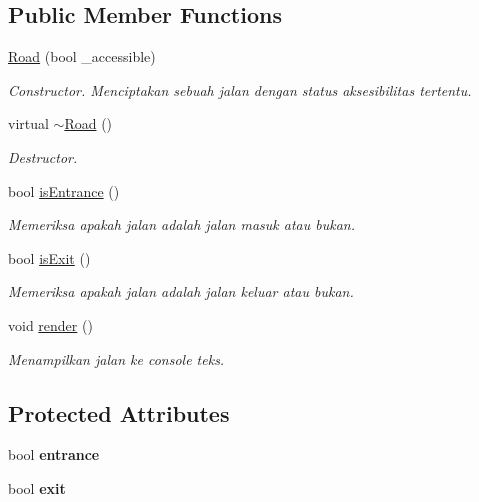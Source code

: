 \subsection*{Public Member Functions}
\begin{DoxyCompactItemize}
\item 
\hyperlink{classRoad_ae98fca3cfb8223b281b4d7787646cf38}{Road} (bool \+\_\+accessible)
\begin{DoxyCompactList}\small\item\em Constructor. Menciptakan sebuah jalan dengan status aksesibilitas tertentu. \end{DoxyCompactList}\item 
\hypertarget{classRoad_a3fa0feda8a96c3763d5f5a1f06f2972e}{virtual \hyperlink{classRoad_a3fa0feda8a96c3763d5f5a1f06f2972e}{$\sim$\+Road} ()}\label{classRoad_a3fa0feda8a96c3763d5f5a1f06f2972e}

\begin{DoxyCompactList}\small\item\em Destructor. \end{DoxyCompactList}\item 
bool \hyperlink{classRoad_a6ada8e407c575e9d03d07f51ad318df6}{is\+Entrance} ()
\begin{DoxyCompactList}\small\item\em Memeriksa apakah jalan adalah jalan masuk atau bukan. \end{DoxyCompactList}\item 
bool \hyperlink{classRoad_a0c12e19a4da50574f6411aebeb12cdb5}{is\+Exit} ()
\begin{DoxyCompactList}\small\item\em Memeriksa apakah jalan adalah jalan keluar atau bukan. \end{DoxyCompactList}\item 
\hypertarget{classRoad_a4a031caf04affb2713ff55b10e8164ae}{void \hyperlink{classRoad_a4a031caf04affb2713ff55b10e8164ae}{render} ()}\label{classRoad_a4a031caf04affb2713ff55b10e8164ae}

\begin{DoxyCompactList}\small\item\em Menampilkan jalan ke console teks. \end{DoxyCompactList}\end{DoxyCompactItemize}
\subsection*{Protected Attributes}
\begin{DoxyCompactItemize}
\item 
\hypertarget{classRoad_a7fe82c4562bc4fa4f5bda463bca6f164}{bool {\bfseries entrance}}\label{classRoad_a7fe82c4562bc4fa4f5bda463bca6f164}

\item 
\hypertarget{classRoad_ac2a5118e48a0da0eb154a5dcc1a70b35}{bool {\bfseries exit}}\label{classRoad_ac2a5118e48a0da0eb154a5dcc1a70b35}

\end{DoxyCompactItemize}


